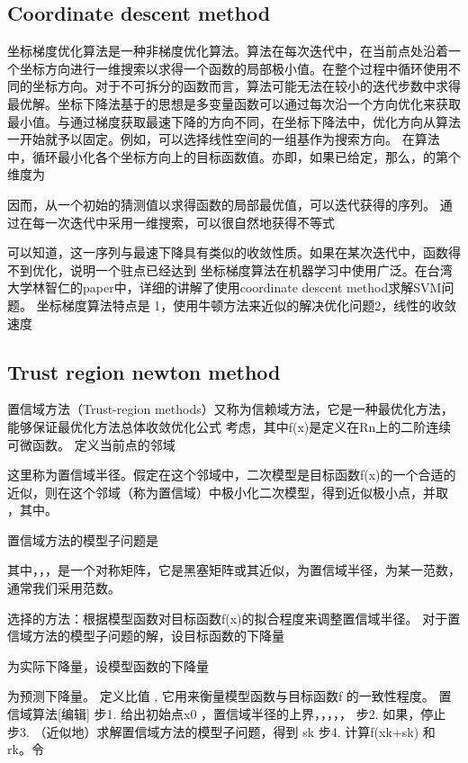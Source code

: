 \documentclass[master]{njuthesis}
\begin{document}
\subsection{Coordinate descent method}

坐标梯度优化算法是一种非梯度优化算法。算法在每次迭代中，在当前点处沿着一个坐标方向进行一维搜索以求得一个函数的局部极小值。在整个过程中循环使用不同的坐标方向。对于不可拆分的函数而言，算法可能无法在较小的迭代步数中求得最优解。坐标下降法基于的思想是多变量函数可以通过每次沿一个方向优化来获取最小值。与通过梯度获取最速下降的方向不同，在坐标下降法中，优化方向从算法一开始就予以固定。例如，可以选择线性空间的一组基作为搜索方向。 在算法中，循环最小化各个坐标方向上的目标函数值。亦即，如果已给定，那么，的第个维度为

因而，从一个初始的猜测值以求得函数的局部最优值，可以迭代获得的序列。
通过在每一次迭代中采用一维搜索，可以很自然地获得不等式

可以知道，这一序列与最速下降具有类似的收敛性质。如果在某次迭代中，函数得不到优化，说明一个驻点已经达到
坐标梯度算法在机器学习中使用广泛。在台湾大学林智仁的paper中，详细的讲解了使用coordinate descent method求解SVM问题。
坐标梯度算法特点是 1，使用牛顿方法来近似的解决优化问题2，线性的收敛速度

\subsection{Trust region newton method}

置信域方法（Trust-region methods）又称为信赖域方法，它是一种最优化方法，能够保证最优化方法总体收敛优化公式
考虑，其中ƒ(x)是定义在Rn上的二阶连续可微函数。 定义当前点的邻域

这里称为置信域半径。假定在这个邻域中，二次模型是目标函数ƒ(x)的一个合适的近似，则在这个邻域（称为置信域）中极小化二次模型，得到近似极小点，并取 ，其中。

置信域方法的模型子问题是

其中，，，是一个对称矩阵，它是黑塞矩阵或其近似，为置信域半径，为某一范数，通常我们采用范数。

选择的方法：根据模型函数对目标函数ƒ(x)的拟合程度来调整置信域半径。 对于置信域方法的模型子问题的解，设目标函数的下降量

为实际下降量，设模型函数的下降量

为预测下降量。 定义比值
,
它用来衡量模型函数与目标函数ƒ 的一致性程度。
置信域算法[编辑]
步1. 给出初始点x0 ，置信域半径的上界，，，，，
步2. 如果，停止
步3. （近似地）求解置信域方法的模型子问题，得到 sk
步4. 计算ƒ(xk+sk) 和 rk。令
\end{document}
